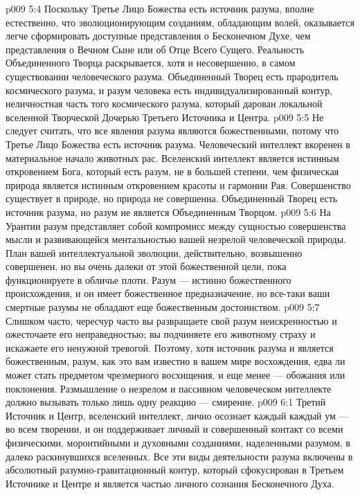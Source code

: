 \vs p009 5:4 \pc Поскольку Третье Лицо Божества есть источник разума, вполне естественно, что эволюционирующим созданиям, обладающим волей, оказывается легче сформировать доступные представления о Бесконечном Духе, чем представления о Вечном Сыне или об Отце Всего Сущего. Реальность Объединенного Творца раскрывается, хотя и несовершенно, в самом существовании человеческого разума. Объединенный Творец есть прародитель космического разума, и разум человека есть индивидуализированный контур, неличностная часть того космического разума, который дарован локальной вселенной Творческой Дочерью Третьего Источника и Центра.
\vs p009 5:5 \pc Не следует считать, что все явления разума являются божественными, потому что Третье Лицо Божества есть источник разума. Человеческий интеллект вкоренен в материальное начало животных рас. Вселенский интеллект является истинным откровением Бога, который есть разум, не в большей степени, чем физическая природа является истинным откровением красоты и гармонии Рая. Совершенство существует в природе, но природа не совершенна. Объединенный Творец есть источник разума, но разум не является Объединенным Творцом.
\vs p009 5:6 На Урантии разум представляет собой компромисс между сущностью совершенства мысли и развивающейся ментальностью вашей незрелой человеческой природы. План вашей интеллектуальной эволюции, действительно, возвышенно совершенен, но вы очень далеки от этой божественной цели, пока функционируете в обличье плоти. Разум --- истинно божественного происхождения, и он имеет божественное предназначение, но все\hyp{}таки ваши смертные разумы не обладают еще божественным достоинством.
\vs p009 5:7 Слишком часто, чересчур часто вы развращаете свой разум неискренностью и ожесточаете его неправедностью; вы подчиняете его животному страху и искажаете его ненужной тревогой. Поэтому, хотя источник разума и является божественным, разум, как это вам известно в вашем мире восхождения, едва ли может стать предметом чрезмерного восхищения, и еще менее --- обожания или поклонения. Размышление о незрелом и пассивном человеческом интеллекте должно вызывать только лишь одну реакцию --- смирение.
\vs p009 6:1 Третий Источник и Центр, вселенский интеллект, лично осознает каждый  каждый ум --- во всем творении, и он поддерживает личный и совершенный контакт со всеми физическими, моронтийными и духовными созданиями, наделенными разумом, в далеко раскинувшихся вселенных. Все эти виды деятельности разума включены в абсолютный разумно\hyp{}гравитационный контур, который сфокусирован в Третьем Источнике и Центре и является частью личного сознания Бесконечного Духа.
